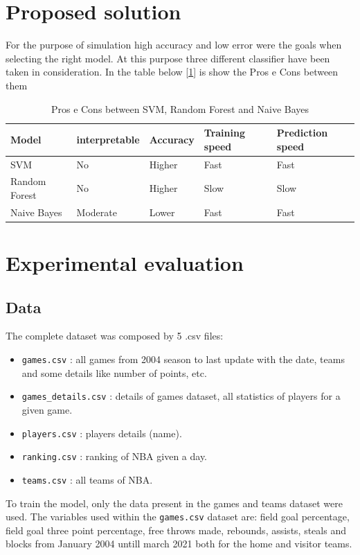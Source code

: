 \documentclass{article}
\begin{document}
\section{Proposed solution}
\label{section: ProposedaSolution}
For the purpose of simulation high accuracy and low error were the goals when selecting the right model. At this purpose three different classifier have been taken in consideration. In the table below [\ref{tab:modelComparison}] is show the Pros e Cons between them
\begin{table}[H]
	\centering
	\begin{tabular}{l|l|l|l|l}
	\toprule
	Model 			& interpretable 	& Accuracy 		& Training speed 	& Prediction speed	\\
    \midrule
    SVM				& No				& Higher							& Fast				& Fast				\\
    \midrule
    Random Forest 	& No				& Higher							& Slow				& Slow				\\
    \midrule
    Naive Bayes		& Moderate			& Lower								& Fast				& Fast          	\\
	\bottomrule
	\end{tabular}
\caption{Pros e Cons between SVM, Random Forest and Naive Bayes}
\label{tab:modelComparison}
\end{table}
\section{Experimental evaluation}
\label{section: ExperimentalEvaluation}
\subsection{Data}
The complete dataset was composed by 5 .csv files:
\begin{itemize}
\item \texttt{games.csv} : all games from 2004 season to last update with the date, teams and some details like number of points, etc.
\item \texttt{games\_details.csv} : details of games dataset, all statistics of players for a given game.
\item \texttt{players.csv} : players details (name).
\item \texttt{ranking.csv} : ranking of NBA given a day.
\item \texttt{teams.csv} : all teams of NBA. 
\end{itemize}
To train the model, only the data present in the games and teams dataset were used. The variables used within the \texttt{games.csv} dataset are: field goal percentage, field goal three point percentage, free throws made, rebounds, assists, steals and blocks from January 2004 untill march 2021 both for the home and visitor teams. 
\end{document}
